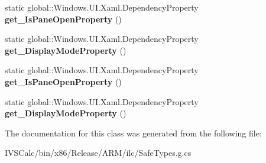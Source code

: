 \begin{DoxyCompactItemize}
static global\+::\+Windows.\+U\+I.\+Xaml.\+Dependency\+Property {\bfseries get\+\_\+\+Is\+Pane\+Open\+Property} ()
\item 
\mbox{\label{class_windows_1_1_u_i_1_1_xaml_1_1_controls_1_1_split_view_aa77525b24678b9fbd2af29bb195bf269}} 
static global\+::\+Windows.\+U\+I.\+Xaml.\+Dependency\+Property {\bfseries get\+\_\+\+Display\+Mode\+Property} ()
\item 
\mbox{\label{class_windows_1_1_u_i_1_1_xaml_1_1_controls_1_1_split_view_a693e5e0c6ca34b729d739f0481248cfd}} 
static global\+::\+Windows.\+U\+I.\+Xaml.\+Dependency\+Property {\bfseries get\+\_\+\+Is\+Pane\+Open\+Property} ()
\item 
\mbox{\label{class_windows_1_1_u_i_1_1_xaml_1_1_controls_1_1_split_view_aa77525b24678b9fbd2af29bb195bf269}} 
static global\+::\+Windows.\+U\+I.\+Xaml.\+Dependency\+Property {\bfseries get\+\_\+\+Display\+Mode\+Property} ()
\end{DoxyCompactItemize}


The documentation for this class was generated from the following file\+:\begin{DoxyCompactItemize}
\item 
I\+V\+S\+Calc/bin/x86/\+Release/\+A\+R\+M/ilc/Safe\+Types.\+g.\+cs\end{DoxyCompactItemize}
